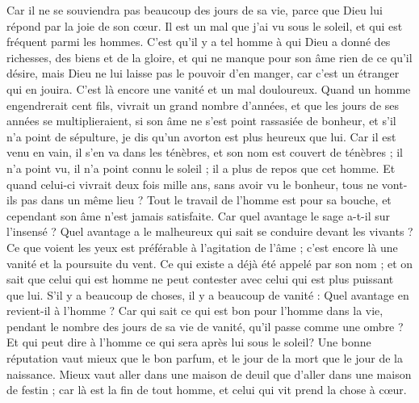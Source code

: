 \begin{multicols}{2}
Car il ne se souviendra pas beaucoup des jours de sa vie, parce que Dieu lui répond par la joie de son cœur.
\VerseOne{}Il est un mal que j'ai vu sous le soleil, et qui est fréquent parmi les hommes.
C'est qu'il y a tel homme à qui Dieu a donné des richesses, des biens et de la gloire, et qui ne manque pour son âme rien de ce qu'il désire, mais Dieu ne lui laisse pas le pouvoir d’en manger, car c’est un étranger qui en jouira. C’est là encore une vanité et un mal douloureux.
Quand un homme engendrerait cent fils, vivrait un grand nombre d’années, et que les jours de ses années se multiplieraient, si son âme ne s'est point rassasiée de bonheur, et s'il n'a point de sépulture, je dis qu'un avorton est plus heureux que lui.
Car il est venu en vain, il s'en va dans les ténèbres, et son nom est couvert de ténèbres ;
il n’a point vu, il n’a point connu le soleil ; il a plus de repos que cet homme.
Et quand celui-ci vivrait deux fois mille ans, sans avoir vu le bonheur, tous ne vont-ils pas dans un même lieu ?
Tout le travail de l'homme est pour sa bouche, et cependant son âme n’est jamais satisfaite.
Car quel avantage le sage a-t-il sur l’insensé ? Quel avantage a le malheureux qui sait se conduire devant les vivants ?
Ce que voient les yeux est préférable à l’agitation de l’âme ; c’est encore là une vanité et la poursuite du vent.
Ce qui existe a déjà été appelé par son nom ; et on sait que celui qui est homme ne peut contester avec celui qui est plus puissant que lui.
S’il y a beaucoup de choses, il y a beaucoup de vanité : Quel avantage en revient-il à l'homme ?
Car qui sait ce qui est bon pour l'homme dans la vie, pendant le nombre des jours de sa vie de vanité, qu’il passe comme une ombre ? Et qui peut dire à l'homme ce qui sera après lui sous le soleil?
\VerseOne{}Une bonne réputation vaut mieux que le bon parfum, et le jour de la mort que le jour de la naissance.
Mieux vaut aller dans une maison de deuil que d'aller dans une maison de festin ; car là est la fin de tout homme, et celui qui vit prend la chose à cœur.

\end{multicols}
